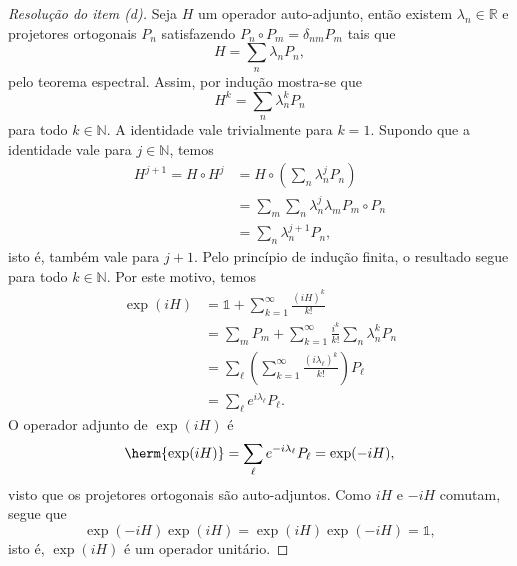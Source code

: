\begin{proof}[Resolução do item (d)]
    Seja \(H\) um operador auto-adjunto, então existem \(\lambda_n \in \mathbb{R}\) e projetores ortogonais \(P_n\) satisfazendo \(P_n \circ P_m = \delta_{nm} P_m\) tais que
    \begin{equation*}
        H = \sum_{n} \lambda_n P_n,
    \end{equation*}
    pelo teorema espectral. Assim, por indução mostra-se que
    \begin{equation*}
        H^k = \sum_{n} \lambda_n^k P_n
    \end{equation*}
    para todo \(k \in \mathbb{N}\). A identidade vale trivialmente para \(k = 1\). Supondo que a identidade vale para \(j \in \mathbb{N}\), temos
    \begin{align*}
        H^{j + 1} = H \circ H^j &= H \circ \left(\sum_{n} \lambda_n^j P_n\right)\\
                                &= \sum_{m} \sum_{n} \lambda_n^j \lambda_m P_m \circ P_n\\
                                &= \sum_{n} \lambda_n^{j+1} P_n,
    \end{align*}
    isto é, também vale para \(j + 1\). Pelo princípio de indução finita, o resultado segue para todo \(k \in \mathbb{N}\). Por este motivo, temos
    \begin{align*}
        \exp(iH) &= \mathds{1} + \sum_{k = 1}^{\infty} \frac{(i H)^k}{k!}\\
                 &= \sum_{m} P_m + \sum_{k=1}^\infty \frac{i^k}{k!} \sum_{n} \lambda_n^k P_n\\
                 &= \sum_\ell \left(\sum_{k=1}^\infty \frac{(i \lambda_\ell)^k}{k!}\right) P_\ell\\
                 &= \sum_{\ell} e^{i \lambda_\ell} P_\ell.
    \end{align*}
    O operador adjunto de \(\exp(iH)\) é
    \begin{equation*}
        \herm{\exp(iH)} = \sum_{\ell} e^{-i \lambda_\ell} P_\ell = \exp(-iH),
    \end{equation*}
    visto que os projetores ortogonais são auto-adjuntos. Como \(iH\) e \(-iH\) comutam, segue que
    \begin{equation*}
        \exp(-iH)\exp(iH) = \exp(iH)\exp(-iH) = \mathds{1},
    \end{equation*}
    isto é, \(\exp(iH)\) é um operador unitário.
\end{proof}
